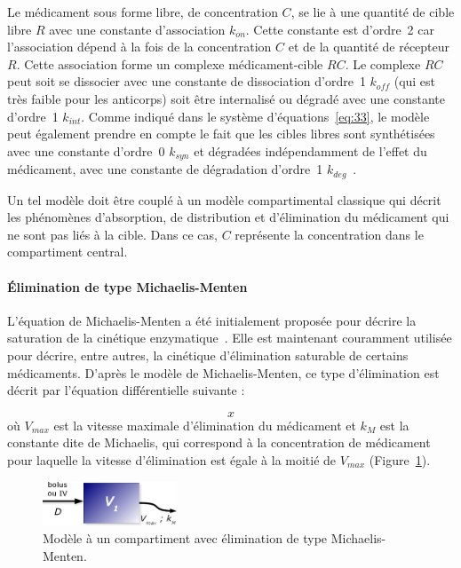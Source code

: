 Le médicament sous forme libre, de concentration $C$, se lie à une quantité de cible libre $R$ avec une constante d'association $k_{on}$. Cette constante est d'ordre~2 car l'association dépend à la fois de la concentration $C$ et de la quantité de récepteur $R$. Cette association forme un complexe médicament-cible $RC$. Le complexe $RC$ peut soit se dissocier avec une constante de dissociation d'ordre~1 $k_{off}$ (qui est très faible pour les anticorps) soit être internalisé ou dégradé avec une constante d'ordre~1 $k_{int}$. Comme indiqué dans le système d'équations~\ref{eq:33}, le modèle peut également prendre en compte le fait que les cibles libres sont synthétisées avec une constante d'ordre~0 $k_{syn}$ et dégradées indépendamment de l'effet du médicament, avec une constante de dégradation d'ordre~1 $k_{deg}$~\citep{REF3}.

Un tel modèle doit être couplé à un modèle compartimental classique qui décrit les phénomènes d'absorption, de distribution et d'élimination du médicament qui ne sont pas liés à la cible. Dans ce cas, $C$ représente la concentration dans le compartiment central.

\paragraph{Élimination de type Michaelis-Menten} L'équation de Michaelis-Menten a été initialement proposée pour décrire la saturation de la cinétique enzymatique~\citep{REF5}. Elle est maintenant couramment utilisée pour décrire, entre autres, la cinétique d'élimination saturable de certains médicaments. D'après le modèle de Michaelis-Menten, ce type d'élimination est décrit par l'équation différentielle suivante :

\begin{equation}
x
\label{eq:34}
\end{equation}
où $V_{max}$ est la vitesse maximale d'élimination du médicament et $k_M$ est la constante dite de Michaelis, qui correspond à la concentration de médicament pour laquelle la vitesse d'élimination est égale à la moitié de $V_{max}$ (Figure~\ref{fig:7}).

\begin{figure}[htbp]
	\centering
		\includegraphics[width=4cm]{figures/raster/FIG_7}
	\caption{Modèle à un compartiment avec élimination de type Michaelis-Menten.}
	\label{fig:7}
\end{figure}

